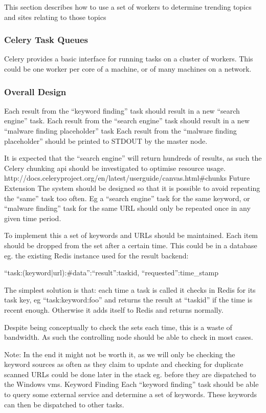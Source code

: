 This section describes how to use a set of workers to determine trending topics and sites relating to those topics


\subsubsection{Celery Task Queues}
Celery provides a basic interface for running tasks on a cluster of workers. This could be one worker per core of a machine, or of many machines on a network.

\subsubsection{Overall Design}
Each result from the ``keyword finding'' task should result in a new ``search engine'' task.
Each result from the ``search engine'' task should result in a new ``malware finding placeholder'' task
Each result from the ``malware finding placeholder'' should be printed to STDOUT by the master node.

It is expected that the ``search engine'' will return hundreds of results, as such the Celery chunking api should be investigated to optimise resource usage. http://docs.celeryproject.org/en/latest/userguide/canvas.html#chunks
Future Extension
The system should be designed so that it is possible to avoid repeating the ``same'' task too often. Eg a ``search engine'' task for the same keyword, or ``malware finding'' task for the same URL should only be repeated once in any given time period.

To implement this a set of keywords and URLs should be maintained. Each item should be dropped from the set after a certain time. This could be in a database eg. the existing Redis instance used for the result backend:

{``task:(keyword|url):#{data}'':{``result'':taskid, ``requested'':time_stamp}}

The simplest solution is that: each time a task is called it checks in Redis for its task key, eg ``task:keyword:foo'' and returns the result at ``taskid'' if the time is recent enough. Otherwise it adds itself to Redis and returns normally.

Despite being conceptually to check the sets each time, this is a waste of bandwidth. As such the controlling node should be able to check in most cases.

Note: In the end it might not be worth it, as we will only be checking the keyword sources as often as they claim to update and checking for duplicate scanned URLs could be done later in the stack eg. before they are dispatched to the Windows vms.
Keyword Finding
Each ``keyword finding'' task should be able to query some external service and determine a set of keywords. These keywords can then be dispatched to other tasks.

